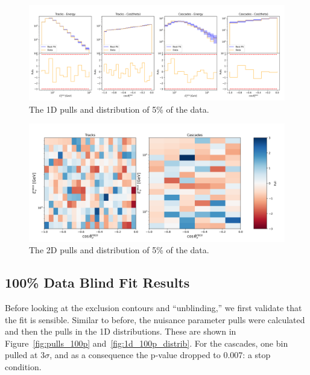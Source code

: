 \documentclass[main.tex]{subfiles}
\begin{document}
\begin{figure}
    \centering
    \includegraphics[width=0.9\linewidth]{./figures/blindfit/goodness_joint_data_5p_with_flavor_update_IC86_data_five_percent.png}
    \caption{The 1D pulls and distribution of 5\% of the data.}\label{fig:1d_5p_distrib}
\end{figure}

\begin{figure}
    \centering
    \includegraphics[width=0.9\linewidth]{./figures/blindfit/2dpulls_joint_data_5p_with_flavor_update_fix_IC86_data_five_percent.png}
    \caption{The 2D pulls and distribution of 5\% of the data.}\label{fig:2d_5p_distrib}
\end{figure}

\subsection{100\% Data Blind Fit Results}\label{sec:ice_chaos_ohgod}

Before looking at the exclusion contours and ``unblinding,'' we first validate that the fit is sensible. 
Similar to before, the nuisance parameter pulls were calculated and then the pulls in the 1D distributions. 
These are shown in Figure~\ref{fig:pulls_100p} and~\ref{fig:1d_100p_distrib}.
For the cascades, one bin pulled at $3\sigma$, and as a consequence the p-value dropped to 0.007: a stop condition. 
\end{document}

